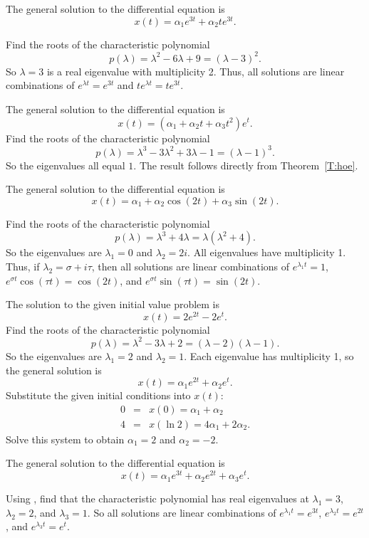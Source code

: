  \ans The general solution to the differential equation is
\[
x(t) = \alpha_1e^{3t} + \alpha_2te^{3t}.
\]

\soln Find the roots of the characteristic polynomial
\[
p(\lambda) = \lambda^2 - 6\lambda + 9 = (\lambda - 3)^2.
\]
So $\lambda = 3$ is a real eigenvalue with multiplicity 2.  Thus, all
solutions are linear combinations of $e^{\lambda t} = e^{3t}$ and
$te^{\lambda t} = te^{3t}$.

 \ans The general solution to the differential equation is
\[
x(t) = (\alpha_1+\alpha_2 t + \alpha_3 t^2) e^t.
\]
\soln Find the roots of the characteristic polynomial
\[
p(\lambda) = \lambda^3 - 3\lambda^2 + 3\lambda - 1 = (\lambda - 1)^3.
\]
So the eigenvalues all equal $1$.  The result follows directly from
Theorem~\ref{T:hoe}.

 \ans The general solution to the differential equation is
\[
x(t) = \alpha_1 + \alpha_2\cos(2t) + \alpha_3\sin(2t).
\]

\soln Find the roots of the characteristic polynomial
\[
p(\lambda) = \lambda^3 + 4\lambda = \lambda(\lambda^2 + 4).
\]
So the eigenvalues are $\lambda_1 = 0$ and $\lambda_2 = 2i$.  All
eigenvalues have multiplicity 1.  Thus, if $\lambda_2 = \sigma + i\tau$, then
all solutions are linear combinations of $e^{\lambda_1 t} = 1$,
$e^{\sigma t}\cos(\tau t) = \cos(2t)$, and $e^{\sigma t}\sin(\tau t)
= \sin(2t)$.

 \ans The solution to the given initial value problem is
\[
x(t) = 2e^{2t} - 2e^t.
\]
\soln Find the roots of the characteristic polynomial
\[
p(\lambda) = \lambda^2 - 3\lambda + 2 = (\lambda - 2)(\lambda - 1).
\]
So the eigenvalues are $\lambda_1 = 2$ and $\lambda_2 = 1$.  Each eigenvalue
has multiplicity 1, so the general solution is
\[
x(t) = \alpha_1e^{2t} + \alpha_2e^t.
\]
Substitute the given initial conditions into $x(t)$:
\[
\begin{array}{rcl}
0 & = & x(0) = \alpha_1 + \alpha_2 \\
4 & = & x(\ln 2) = 4\alpha_1 + 2\alpha_2.
\end{array}
\]
Solve this system to obtain $\alpha_1 = 2$ and $\alpha_2 = -2$.

 \ans The general solution to the differential equation is
\[
x(t) = \alpha_1e^{3t} + \alpha_2e^{2t} + \alpha_3e^t.
\]

\soln Using \Matlab, find that the characteristic polynomial has real
eigenvalues at $\lambda_1 = 3$, $\lambda_2 = 2$, and $\lambda_3 = 1$.  So
all solutions are linear combinations of $e^{\lambda_1 t} = e^{3t}$,
$e^{\lambda_2 t} = e^{2t}$, and $e^{\lambda_3 t} = e^t$.


